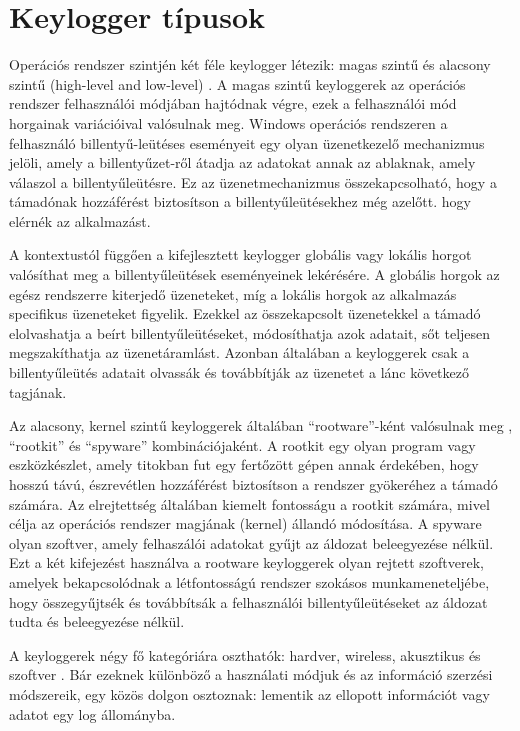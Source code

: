 \documentclass[12pt,a4paper,oneside]{report}
\begin{document}
\section{Keylogger típusok}
Operációs rendszer szintjén két féle keylogger létezik: magas szintű és alacsony szintű (high-level and low-level) \cite{wood2010keyloggers}. A magas szintű keyloggerek az operációs rendszer felhasználói módjában hajtódnak végre, ezek a felhasználói mód horgainak variációival valósulnak meg. Windows operációs rendszeren a felhasználó billentyű-leütéses eseményeit egy olyan üzenetkezelő mechanizmus jelöli, amely a billentyűzet-ről átadja az adatokat annak az ablaknak, amely válaszol a billentyűleütésre. Ez az üzenetmechanizmus összekapcsolható, hogy a támadónak hozzáférést biztosítson a billentyűleütésekhez még azelőtt. hogy elérnék az alkalmazást.

A kontextustól függően a kifejlesztett keylogger globális vagy lokális horgot valósíthat meg a billentyűleütések eseményeinek lekérésére. A globális horgok az egész rendszerre kiterjedő üzeneteket, míg a lokális horgok az alkalmazás specifikus üzeneteket figyelik. Ezekkel az összekapcsolt üzenetekkel a támadó elolvashatja a beírt billentyűleütéseket, módosíthatja azok adatait, sőt teljesen megszakíthatja az üzenetáramlást. Azonban általában a keyloggerek csak a billentyűleütés adatait olvassák és továbbítják az üzenetet a lánc következő tagjának.

Az alacsony, kernel szintű keyloggerek általában ``rootware''-ként valósulnak meg \cite{butler2006r2}, ``rootkit'' és ``spyware'' kombinációjaként. A rootkit egy olyan program vagy eszközkészlet, amely titokban fut egy fertőzött gépen annak érdekében, hogy hosszú távú, észrevétlen hozzáférést biztosítson a rendszer gyökeréhez a támadó számára. Az elrejtettség általában kiemelt fontosságu a rootkit számára, mivel célja az operációs rendszer magjának (kernel) állandó módosítása. A spyware olyan szoftver, amely felhaszálói adatokat gyűjt az áldozat beleegyezése nélkül. Ezt a két kifejezést használva a rootware keyloggerek olyan rejtett szoftverek, amelyek bekapcsolódnak a létfontosságú rendszer szokásos munkameneteljébe, hogy összegyűjtsék és továbbítsák a felhasználói billentyűleütéseket az áldozat tudta és beleegyezése nélkül.

A keyloggerek négy fő kategóriára oszthatók: hardver, wireless, akusztikus és szoftver \cite{ahmed2014survey}. Bár ezeknek különböző a használati módjuk és az információ szerzési módszereik, egy közös dolgon osztoznak: lementik az ellopott információt vagy adatot egy log állományba.
\end{document}
